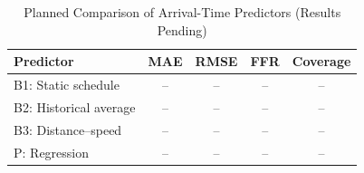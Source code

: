 \begin{table}[t]
\caption{Planned Comparison of Arrival-Time Predictors (Results Pending)}
\label{tab:comparison}
\centering
\begin{tabular}{lcccc}
\toprule
Predictor & MAE & RMSE & FFR & Coverage \\
\midrule
B1: Static schedule & -- & -- & -- & -- \\
B2: Historical average & -- & -- & -- & -- \\
B3: Distance--speed & -- & -- & -- & -- \\
P: Regression & -- & -- & -- & -- \\
\bottomrule
\end{tabular}
\end{table}

